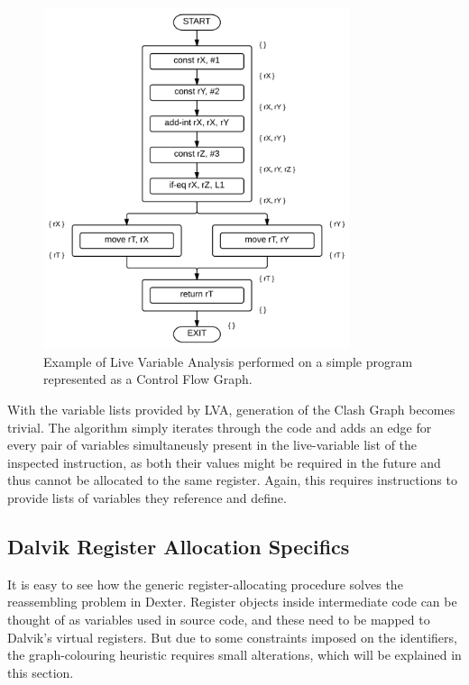 \documentclass[12pt,twoside,notitlepage]{report}
\begin{document}
\begin{figure}
	\centerline{	
		\includegraphics[width=0.8\textwidth]{figs/fig_implementation_lva.png}
	}
	\caption{Example of Live Variable Analysis performed on a simple program represented as a Control Flow Graph.}
	\label{fig:Implementation_LVA}
\end{figure}

With the variable lists provided by LVA, generation of the Clash Graph becomes trivial. The algorithm simply iterates through the code and adds an edge for every pair of variables simultaneusly present in the live-variable list of the inspected instruction, as both their values might be required in the future and thus cannot be allocated to the same register. Again, this requires instructions to provide lists of variables they reference and define.

\subsection{Dalvik Register Allocation Specifics}

It is easy to see how the generic register-allocating procedure solves the reassembling problem in Dexter. Register objects inside intermediate code can be thought of as variables used in source code, and these need to be mapped to Dalvik's virtual registers. But due to some constraints imposed on the identifiers, the graph-colouring heuristic requires small alterations, which will be explained in this section.
\end{document}

